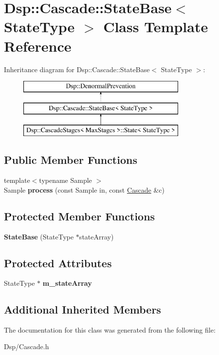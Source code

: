 \hypertarget{classDsp_1_1Cascade_1_1StateBase}{\section{Dsp\-:\-:Cascade\-:\-:State\-Base$<$ State\-Type $>$ Class Template Reference}
\label{classDsp_1_1Cascade_1_1StateBase}
}
Inheritance diagram for Dsp\-:\-:Cascade\-:\-:State\-Base$<$ State\-Type $>$\-:\begin{figure}[H]
\begin{center}
\leavevmode
\includegraphics[height=3.000000cm]{classDsp_1_1Cascade_1_1StateBase}
\end{center}
\end{figure}
\subsection*{Public Member Functions}
\begin{DoxyCompactItemize}
\item 
\hypertarget{classDsp_1_1Cascade_1_1StateBase_a0e785908564fd134f65f6443857db593}{{\footnotesize template$<$typename Sample $>$ }\\Sample {\bfseries process} (const Sample in, const \hyperlink{classDsp_1_1Cascade}{Cascade} \&c)}\label{classDsp_1_1Cascade_1_1StateBase_a0e785908564fd134f65f6443857db593}

\end{DoxyCompactItemize}
\subsection*{Protected Member Functions}
\begin{DoxyCompactItemize}
\item 
\hypertarget{classDsp_1_1Cascade_1_1StateBase_a19005394cdc726f1b114d344d2ccbb3a}{{\bfseries State\-Base} (State\-Type $\ast$state\-Array)}\label{classDsp_1_1Cascade_1_1StateBase_a19005394cdc726f1b114d344d2ccbb3a}

\end{DoxyCompactItemize}
\subsection*{Protected Attributes}
\begin{DoxyCompactItemize}
\item 
\hypertarget{classDsp_1_1Cascade_1_1StateBase_a6fe4cebdd30277099f3265e362c23aa6}{State\-Type $\ast$ {\bfseries m\-\_\-state\-Array}}\label{classDsp_1_1Cascade_1_1StateBase_a6fe4cebdd30277099f3265e362c23aa6}

\end{DoxyCompactItemize}
\subsection*{Additional Inherited Members}


The documentation for this class was generated from the following file\-:\begin{DoxyCompactItemize}
\item 
Dsp/Cascade.\-h\end{DoxyCompactItemize}
